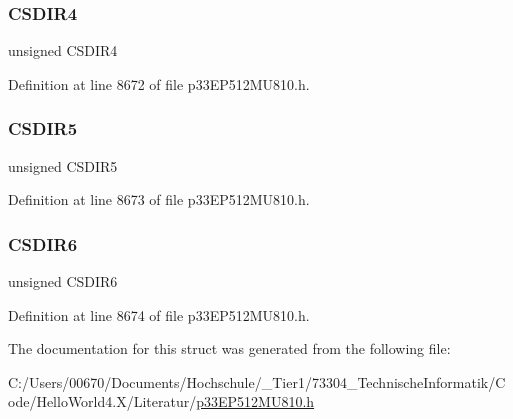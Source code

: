 \subsubsection{\texorpdfstring{C\+S\+D\+I\+R4}{CSDIR4}}
{\footnotesize\ttfamily unsigned C\+S\+D\+I\+R4}



Definition at line 8672 of file p33\+E\+P512\+M\+U810.\+h.

\mbox{\label{structtag_r_p_i_n_r24_b_i_t_s_a61b2dcf647a176e3e8a89c6ca1c4f8e2}} 
\subsubsection{\texorpdfstring{C\+S\+D\+I\+R5}{CSDIR5}}
{\footnotesize\ttfamily unsigned C\+S\+D\+I\+R5}



Definition at line 8673 of file p33\+E\+P512\+M\+U810.\+h.

\mbox{\label{structtag_r_p_i_n_r24_b_i_t_s_a626381e5c26a2333c7d7a39a0b68f71a}} 
\subsubsection{\texorpdfstring{C\+S\+D\+I\+R6}{CSDIR6}}
{\footnotesize\ttfamily unsigned C\+S\+D\+I\+R6}



Definition at line 8674 of file p33\+E\+P512\+M\+U810.\+h.



The documentation for this struct was generated from the following file\+:\begin{DoxyCompactItemize}
\item 
C\+:/\+Users/00670/\+Documents/\+Hochschule/\+\_\+\+Tier1/73304\+\_\+\+Technische\+Informatik/\+Code/\+Hello\+World4.\+X/\+Literatur/\hyperlink{p33_e_p512_m_u810_8h}{p33\+E\+P512\+M\+U810.\+h}\end{DoxyCompactItemize}
